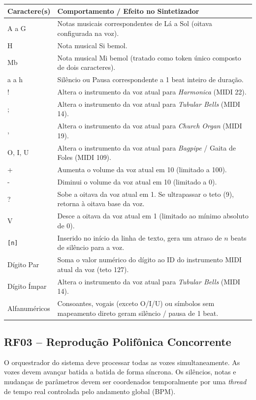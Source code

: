 \documentclass[12pt, a4paper]{article}
\begin{document}
\begin{center}
\small
\begin{tabular}{lp{11.5cm}}
  \toprule
  \textbf{Caractere(s)} & \textbf{Comportamento / Efeito no Sintetizador} \\
  \midrule
  A a G & Notas musicais correspondentes de Lá a Sol (oitava configurada na voz). \\
  H & Nota musical Si bemol. \\
  Mb & Nota musical Mi bemol (tratado como token único composto de dois caracteres). \\
  a a h & Silêncio ou Pausa correspondente a 1 beat inteiro de duração. \\
  ! & Altera o instrumento da voz atual para \textit{Harmonica} (MIDI 22). \\
  ; & Altera o instrumento da voz atual para \textit{Tubular Bells} (MIDI 14). \\
  , & Altera o instrumento da voz atual para \textit{Church Organ} (MIDI 19). \\
  O, I, U & Altera o instrumento da voz atual para \textit{Bagpipe} / Gaita de Foles (MIDI 109). \\
  + & Aumenta o volume da voz atual em 10 (limitado a 100). \\
  - & Diminui o volume da voz atual em 10 (limitado a 0). \\
  ? & Sobe a oitava da voz atual em 1. Se ultrapassar o teto (9), retorna à oitava base da voz. \\
  V & Desce a oitava da voz atual em 1 (limitado ao mínimo absoluto de 0). \\

  \texttt{[n]} & Inserido no início da linha de texto, gera um atraso de $n$ beats de silêncio para a voz. \\
  Dígito Par & Soma o valor numérico do dígito ao ID do instrumento MIDI atual da voz (teto 127). \\
  Dígito Ímpar & Altera o instrumento da voz atual para \textit{Tubular Bells} (MIDI 14). \\
  Alfanuméricos & Consoantes, vogais (exceto O/I/U) ou símbolos sem mapeamento direto geram silêncio / pausa de 1 beat. \\
  \bottomrule
\end{tabular}
\end{center}

\subsection{RF03 -- Reprodução Polifônica Concorrente}
O orquestrador do sistema deve processar todas as vozes simultaneamente. As vozes devem avançar batida a batida de forma síncrona. Os silêncios, notas e mudanças de parâmetros devem ser coordenados temporalmente por uma \textit{thread} de tempo real controlada pelo andamento global (BPM).
\end{document}
